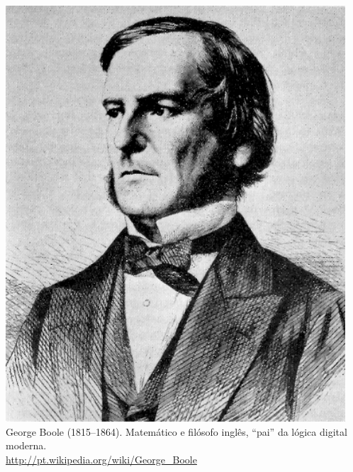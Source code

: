\documentclass{beamer}
\newcommand{\comment}[1]{{\color{structure.fg!70!white}\footnotesize #1}}
\begin{document}
\begin{frame}
\begin{minipage}{0.37\textwidth}
\hfill\includegraphics[width=0.95\textwidth]{images/georgeboole}%
\hfill\phantom{.}\\
\footnotesize{\color{gray}George Boole (1815--1864). Ma\-te\-má\-ti\-co e
filósofo inglês, ``pai'' da lógica digital moderna.}\\\comment{\tiny{\href{http://pt.wikipedia.org/wiki/George_Boole}{http://pt.wikipedia.org/wiki/George\_Boole}}}
\end{minipage}

\end{frame}
\end{document}
